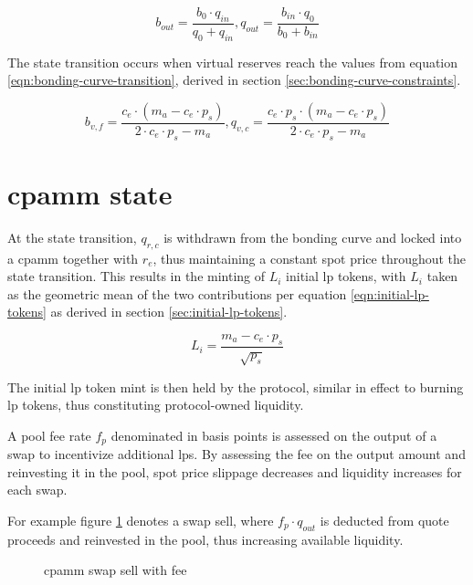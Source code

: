 \documentclass[table, twocolumn]{article}
\begin{document}
\begin{equation} \label{eqn:b-q-out-cpamm-simple}
  b_{out} = \frac{b_0 \cdot q_{in}}{q_0 + q_{in}},
  q_{out} = \frac{b_{in} \cdot q_0}{b_0 + b_{in}}
\end{equation}

The state transition occurs when virtual reserves reach the values from equation
\ref{eqn:bonding-curve-transition}, derived in section
\ref{sec:bonding-curve-constraints}.

\begin{equation} \label{eqn:bonding-curve-transition}
  b_{v, f} = \frac{c_e \cdot (m_a - c_e \cdot p_s)}{2 \cdot c_e \cdot p_s - m_a},
  q_{v, c} = \frac{c_e \cdot p_s \cdot(m_a - c_e \cdot p_s)}
  {2 \cdot c_e \cdot p_s - m_a}
\end{equation}

\section{\gls*{cpamm} state}

At the state transition, $q_{r, c}$ is withdrawn from the bonding curve and locked into
a \gls*{cpamm} together with $r_e$, thus maintaining a constant spot price throughout
the state transition. This results in the minting of $L_i$ initial \gls*{lp} tokens,
with $L_i$ taken as the geometric mean of the two contributions per equation
\ref{eqn:initial-lp-tokens} as derived in section \ref{sec:initial-lp-tokens}.

\begin{equation} \label{eqn:initial-lp-tokens}
  L_i = \frac{m_a - c_e \cdot p_s}{\sqrt{p_s}}
\end{equation}

The initial \gls*{lp} token mint is then held by the protocol, similar in effect to
burning \gls*{lp} tokens, thus constituting protocol-owned liquidity.

A pool fee rate $f_p$ denominated in basis points is assessed on the output of a swap to
incentivize additional \gls*{lp}s.  By assessing the fee on the output amount and
reinvesting it in the pool, spot price slippage decreases and liquidity increases for
each swap.

For example figure \ref{fig:cpamm-swap-sell-with-fee} denotes a swap sell, where
$f_p \cdot q_{out}$ is deducted from quote proceeds and reinvested in the pool, thus
increasing available liquidity.

\begin{figure}[!htb]
  \centering
  
  \caption{\gls*{cpamm} swap sell with fee}
  \label{fig:cpamm-swap-sell-with-fee}
\end{figure}
\end{document}

